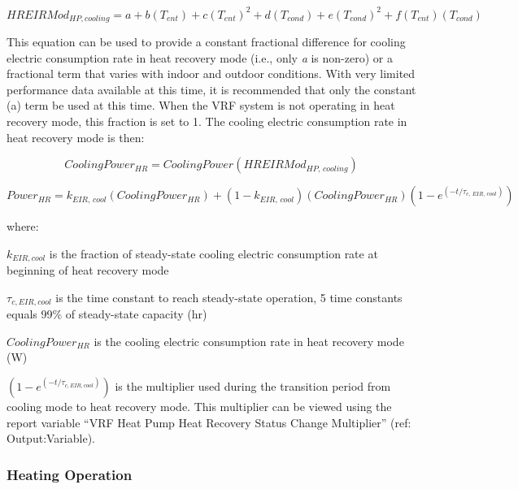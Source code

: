 \begin{equation}
  HREIRMod_{HP,cooling} = a + b \left( T_{ent} \right) + c \left( T_{ent} \right)^2 + d \left( T_{cond} \right) + e \left( T_{cond} \right)^2 + f \left( T_{ent} \right) \left( T_{cond} \right)
\end{equation}

This equation can be used to provide a constant fractional difference for cooling electric consumption rate in heat recovery mode (i.e., only \emph{a} is non-zero) or a fractional term that varies with indoor and outdoor conditions. With very limited performance data available at this time, it is recommended that only the constant (a) term be used at this time. When the VRF system is not operating in heat recovery mode, this fraction is set to 1. The cooling electric consumption rate in heat recovery mode is then:

\begin{equation}
  CoolingPower_{HR} = CoolingPower \left( HREIRMod_{HP,\,cooling} \right)
\end{equation}

\begin{equation}
  Power_{HR} = k_{EIR,\,cool} \left( CoolingPower_{HR} \right) + \left( 1 - k_{EIR,\,cool} \right) \left( CoolingPower_{HR} \right) \left( 1 - e^{\left( -t / \tau_{c,\,EIR,\,cool} \right)} \right)
\end{equation}

where:

\(k_{EIR,cool}\) is the fraction of steady-state cooling electric consumption rate at beginning of heat recovery mode

\(\tau_{c,EIR,cool}\) is the time constant to reach steady-state operation, 5 time constants equals 99\% of steady-state capacity (hr)

\(CoolingPower_{HR}\) is the cooling electric consumption rate in heat recovery mode (W)

\(\left( 1 - e^{\left( -t / \tau_{c,EIR,cool} \right)} \right)\) is the multiplier used during the transition period from cooling mode to heat recovery mode. This multiplier can be viewed using the report variable ``VRF Heat Pump Heat Recovery Status Change Multiplier'' (ref: Output:Variable).

\subsubsection{Heating Operation}\label{heating-operation-201605050924}

